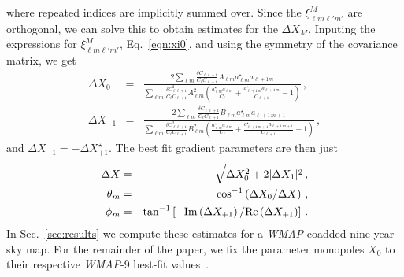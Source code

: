 \documentclass[twocolumn,aps,prd,showpacs]{revtex4}
\def\beq{\begin{equation}}
\def\eeq{\end{equation}}
\def\ld{\left}
\def\rd{\right}
\begin{document}
where repeated indices are implicitly summed over. Since the 
$\xi^M_{\ell m \ell' m'}$ are orthogonal, we can solve this to obtain estimates 
for the $\Delta X_M$. Inputing the expressions for $\xi^M_{\ell m \ell' m'}$, 
Eq.~\eqref{eqn:xi0}, and using the symmetry of the covariance matrix, we get
\begin{eqnarray}\label{eqn:delXest}
\Delta X_0^{} &=&  \frac{2 \sum_{\ell m} 
\frac{\delta C_{\ell \ell+1}}{ C_{\ell}C_{\ell+1}} A_{\ell m}
  a _{\ell m}^{\star} a_{\ell+1 m}  }{\sum_{\ell m}
  \frac{\delta C_{\ell \ell+1}^2}{ C_{\ell}C_{\ell+1}} A_{\ell m}^2
 \left(  \frac{a^{\star}_{\ell m}  a_{\ell m}}{C_{\ell}}
 + \frac{a^{\star}_{\ell+1 \, m}  a_{\ell+1 \, m}}{C_{\ell+1}}  -1  \right)}
 \,,\\
\Delta X_{+1} &=&  \frac{2 \sum_{\ell m} 
\frac{\delta C_{\ell \ell+1}}{ C_{\ell}C_{\ell+1}} B_{\ell m}
  a _{\ell m}^{\star} a_{\ell+1 \, m+1}  }{\sum_{\ell m}
  \frac{\delta C_{\ell \ell+1}^2}{ C_{\ell}C_{\ell+1}} B_{\ell m}^2
 \left( \frac{a^{\star}_{\ell m}  a_{\ell m}}{C_{\ell}}
  + \frac{a^{\star}_{\ell+1 \, m+1}  a_{\ell+1 \, m+1}}{C_{\ell+1}}  -1  \right)} \,,
\end{eqnarray}
and $\Delta X_{-1}=-\Delta X_{+1}^\star$.
The best fit gradient parameters are then just
\begin{eqnarray}\label{eqn:estimates1}
\Delta X &=& \sqrt{\Delta X_0^2 + 2|\Delta X_1|^2 }\,,\\
\label{eqn:estimates2}\theta_m &=& \cos^{-1}\left( \Delta X_0/\Delta X\right)\,,\\
\label{eqn:estimates3}\phi_m &=& \tan^{-1} \left[ - {\rm Im}
 \left( \Delta X_{+1} \right) / {\rm Re}  \left(\Delta X_{+1} \right)   \right]\,.
\end{eqnarray}
In Sec.~\ref{sec:results} we compute these estimates for a  {\em WMAP\/} 
coadded nine year sky map. For the remainder of the paper, we fix the 
parameter monopoles $X_0$ to their respective {\it WMAP\/}-9 best-fit 
values~\cite{Komatsu:2010fb}. 



\end{document}
